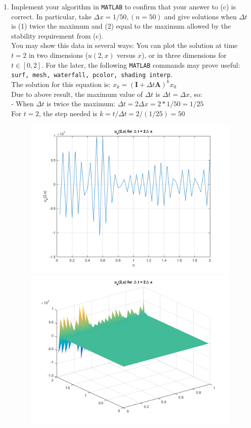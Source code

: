 \documentclass[14pt,a4paper]{article}
\begin{document}
\begin{enumerate}
	\label{4d}
	\item Implement your algorithm in \texttt{MATLAB} to confirm that your answer to (c) is correct. In particular, take $\Delta x = 1/50, (n = 50)$ and give solutions when $\Delta t$ is (1) twice the maximum and (2) equal to the maximum allowed by the stability requirement from (c).\\
	You may show this data in several ways: You can plot the solution at time $t =2$ in two dimensions ($u(2,x)$ versus $x$), or in three dimensions for $t \in [0,2]$. For the later, the following \texttt{MATLAB} commands may prove useful: \texttt{surf, mesh, waterfall, pcolor, shading interp}.\\
	The solution for this equation is: $x_k = (\textbf{I} + \Delta t\textbf{A})^kx_0$\\
	Due to above result, the maximum value of $\Delta t$ is $\Delta t = \Delta x$, so:\\
	- When $\Delta t$ is twice the maximum: $\Delta t = 2\Delta x = 2*1/50 = 1/25$\\
	For $t = 2$, the step needed is $k = t/\Delta t = 2/(1/25) = 50$\\
	\begin{figure}[htp]
		\centering
		\includegraphics[scale=0.4]{hw6_4d1.png}
		\includegraphics[scale=0.4]{hw6_4d2.png}

\end{figure}
\end{enumerate}
\end{document}
